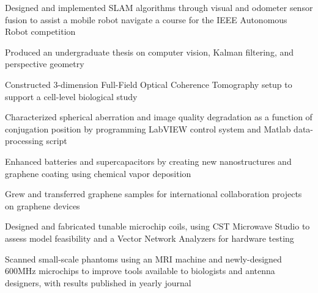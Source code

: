 \documentclass[letterpaper]{article}
\begin{document}
\begin{compactitem}
	\item Designed and implemented SLAM algorithms through visual and odometer sensor fusion to assist a mobile robot navigate a course for the IEEE Autonomous Robot competition\\
	\item Produced an undergraduate thesis on computer vision, Kalman filtering, and perspective geometry
\end{compactitem}

\begin{compactitem}
	\item Constructed 3-dimension Full-Field Optical Coherence Tomography setup to support a cell-level biological study\\
	\item Characterized spherical aberration and image quality degradation as a function of conjugation position by programming LabVIEW control system and Matlab data-processing script
\end{compactitem}

\begin{compactitem}
	\item Enhanced batteries and supercapacitors by creating new nanostructures and graphene coating using chemical vapor deposition\\
	\item Grew and transferred graphene samples for international collaboration projects on graphene devices
\end{compactitem}

\begin{compactitem}
	\item Designed and fabricated tunable microchip coils, using CST Microwave Studio to assess model feasibility and a Vector Network Analyzers for hardware testing\\ 
	\item Scanned small-scale phantoms using an MRI machine and newly-designed 600MHz microchips to improve tools available to biologists and antenna designers, with results published in yearly journal
\end{compactitem}
\end{document}
